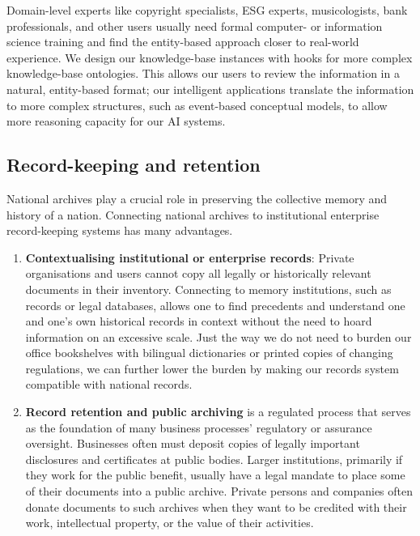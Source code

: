 \documentclass[
  letterpaper,
  DIV=11,
  numbers=noendperiod]{scrreprt}
\begin{document}
\begin{tcolorbox}[enhanced jigsaw, opacityback=0, bottomrule=.15mm, rightrule=.15mm, toptitle=1mm, breakable, colbacktitle=quarto-callout-note-color!10!white, colback=white, title=\textcolor{quarto-callout-note-color}{\faInfo}\hspace{0.5em}{Note}, leftrule=.75mm, toprule=.15mm, left=2mm, arc=.35mm, colframe=quarto-callout-note-color-frame, coltitle=black, titlerule=0mm, bottomtitle=1mm, opacitybacktitle=0.6]

Domain-level experts like copyright specialists, ESG experts,
musicologists, bank professionals, and other users usually need formal
computer- or information science training and find the entity-based
approach closer to real-world experience. We design our knowledge-base
instances with hooks for more complex knowledge-base ontologies. This
allows our users to review the information in a natural, entity-based
format; our intelligent applications translate the information to more
complex structures, such as event-based conceptual models, to allow more
reasoning capacity for our AI systems.

\end{tcolorbox}

\subsection{Record-keeping and
retention}\label{record-keeping-and-retention}

National archives play a crucial role in preserving the collective
memory and history of a nation. Connecting national archives to
institutional enterprise record-keeping systems has many advantages.

\begin{enumerate}
\def\labelenumi{\arabic{enumi}.}
\item
  \textbf{Contextualising institutional or enterprise records}: Private
  organisations and users cannot copy all legally or historically
  relevant documents in their inventory. Connecting to memory
  institutions, such as records or legal databases, allows one to find
  precedents and understand one and one's own historical records in
  context without the need to hoard information on an excessive scale.
  Just the way we do not need to burden our office bookshelves with
  bilingual dictionaries or printed copies of changing regulations, we
  can further lower the burden by making our records system compatible
  with national records.
\item
  \textbf{Record retention and public archiving} is a regulated process
  that serves as the foundation of many business processes' regulatory
  or assurance oversight. Businesses often must deposit copies of
  legally important disclosures and certificates at public bodies.
  Larger institutions, primarily if they work for the public benefit,
  usually have a legal mandate to place some of their documents into a
  public archive. Private persons and companies often donate documents
  to such archives when they want to be credited with their work,
  intellectual property, or the value of their activities.
\end{enumerate}
\end{document}
